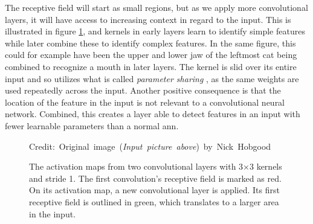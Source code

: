     The receptive field will start as small regions, but as we apply more convolutional layers, it will have access to increasing context in regard to the input\cite{o2015introduction_convolutions}. This is illustrated in figure \ref{receptive_field_fig}, and kernels in early layers learn to identify simple features while later combine these to identify complex features. In the same figure, this could for example have been the upper and lower jaw of the leftmost cat being combined to recognize a mouth in later layers. The kernel is slid over its entire input and so utilizes what is called \textit{parameter sharing }, as the same weights are used repeatedly across the input. Another positive consequence is that the location of the feature in the input is not relevant to a convolutional neural network. Combined, this creates a layer able to detect features in an input with fewer learnable parameters than a normal \gls{ann}. 
    
    \begin{figure}[H]
        \centering
        
        
        \caption[Receptive field]{The activation maps from two convolutional layers with 3×3 kernels and stride 1. The first convolution's receptive field is marked as red. On its activation map, a new convolutional layer is applied. Its first receptive field is outlined in green, which translates to a larger area in the input.}
      	\medskip 
        \hspace*{15pt}\hbox{\scriptsize Credit: Original image (\textit{Input picture above}) by Nick Hobgood\cite{clownfish_image}}
        \label{receptive_field_fig}
    \end{figure}

    
